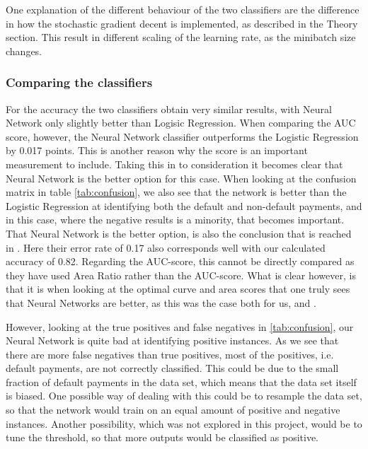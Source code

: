 One explanation of the different behaviour of the two classifiers are the difference in how the stochastic gradient decent is implemented, as described in the Theory section. This result in different scaling of the learning rate, as the minibatch size changes. 

\subsubsection{Comparing the classifiers}
For the accuracy the two classifiers obtain very similar results, with Neural Network only slightly better than Logisic Regression. When comparing the AUC score, however, the Neural Network classifier outperforms the Logistic Regression by 0.017 points. This is another reason why the score is an important measurement to include. Taking this in to consideration it becomes clear that Neural Network is the better option for this case. When looking at the confusion matrix in table \ref{tab:confusion}, we also see that the network is better than the Logistic Regression at identifying both the default and non-default payments, and in this case, where the negative results is a minority, that becomes important. That Neural Network is the better option, is also the conclusion that is reached in \cite{yeh2009UCI}. Here their error rate of 0.17 also corresponds well with our calculated accuracy of 0.82. Regarding the AUC-score, this cannot be directly compared as they have used Area Ratio rather than the AUC-score. What is clear however, is that it is when looking at the optimal curve and area scores that one truly sees that Neural Networks are better, as this was the case both for us, and \cite{yeh2009UCI}.

However, looking at the true positives and false negatives in \ref{tab:confusion}, our Neural Network is quite bad at identifying positive instances. As we see that there are more false negatives than true positives, most of the positives, i.e. default payments, are not correctly classified. This could be due to the small fraction of default payments in the data set, which means that the data set itself is biased. One possible way of dealing with this could be to resample the data set, so that the network would train on an equal amount of positive and negative instances. Another possibility, which was not explored in this project, would be to tune the threshold, so that more outputs would be classified as positive. 

